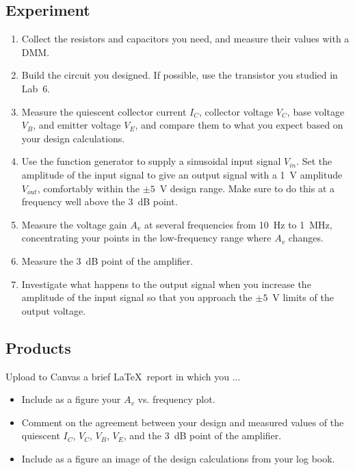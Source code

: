 \documentclass[11pt]{article}
\begin{document}
\subsection*{Experiment}

\begin{enumerate}
\item Collect the resistors and capacitors you need, and measure their
  values with a DMM.
  
\item Build the circuit you designed. If possible, use the transistor
  you studied in Lab~6.

\item Measure the quiescent collector current $I_C$, collector
  voltage $V_C$, base voltage $V_B$, and emitter voltage $V_E$, and
  compare them to what you expect based on your design calculations.
  
\item Use the function generator to supply a sinusoidal input signal
  $V_{in}$. Set the amplitude of the input signal to give an output
  signal with a 1~V amplitude $V_{out}$, comfortably within the
  $\pm5$~V design range. Make sure to do this at a frequency well
  above the 3~dB point.

\item Measure the voltage gain $A_v$ at several frequencies from 10~Hz
  to 1~MHz, concentrating your points in the low-frequency range where
  $A_v$ changes.

\item Measure the 3~dB point of the amplifier.

\item Investigate what happens to the output signal when you increase
  the amplitude of the input signal so that you approach the $\pm5$~V
  limits of the output voltage. 

\end{enumerate}

\subsection*{Products}

Upload to Canvas a brief \LaTeX\ report in which you ...
\begin{itemize}
\item Include as a figure your $A_v$ vs. frequency plot.

\item Comment on the agreement between your design and measured values
  of the quiescent $I_C$, $V_C$, $V_B$, $V_E$, and the 3~dB point
  of the amplifier.

\item Include as a figure an image of the design calculations from
  your log book.
\end{itemize}
\end{document}
